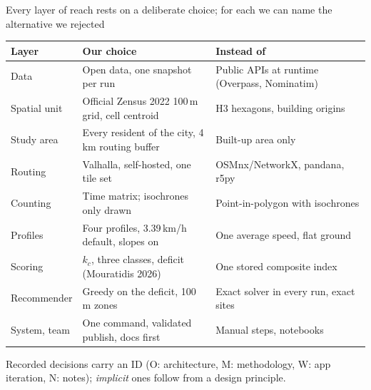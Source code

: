\documentclass[aspectratio=169,10pt]{beamer}
\newcommand{\impl}{\textit{implicit}}
\begin{document}
\begin{frame}{Every layer of reach rests on a deliberate choice; for each we can name the
  alternative we rejected}
  \footnotesize
  \begin{tabular}{@{}P{22mm}P{60mm}P{50mm}@{}}
    \toprule
    Layer & Our choice & Instead of \\
    \midrule
    Data & Open data, one snapshot per run & Public APIs at runtime (Overpass, Nominatim) \\
    Spatial unit & Official Zensus 2022 100\,m grid, cell centroid & H3 hexagons, building
      origins \\
    Study area & Every resident of the city, 4\,km routing buffer & Built-up area only \\
    Routing & Valhalla, self-hosted, one tile set & OSMnx/NetworkX, pandana, r5py \\
    Counting & Time matrix; isochrones only drawn & Point-in-polygon with isochrones \\
    Profiles & Four profiles, 3.39\,km/h default, slopes on & One average speed, flat ground \\
    Scoring & $k_c$, three classes, deficit (Mouratidis 2026) & One stored composite index \\
    Recommender & Greedy on the deficit, 100\,m zones & Exact solver in every run, exact
      sites \\
    System, team & One command, validated publish, docs first & Manual steps, notebooks \\
    \bottomrule
  \end{tabular}
  \par\medskip
  {\scriptsize\color{muted}Recorded decisions carry an ID (O: architecture, M: methodology, W:
  app iteration, N: notes); \impl{} ones follow from a design principle.}
\end{frame}
\end{document}
